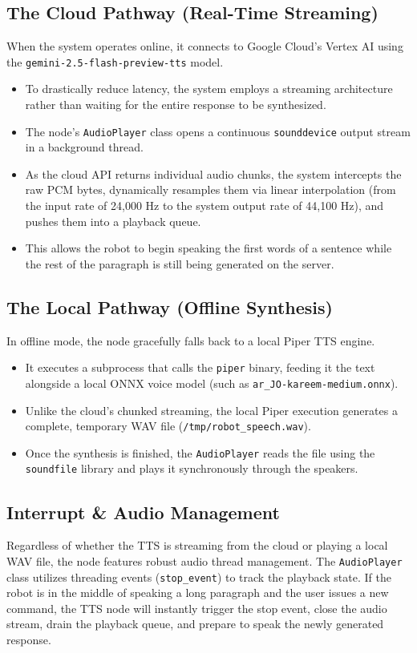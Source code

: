 \subsection{The Cloud Pathway (Real-Time Streaming)}
When the system operates online, it connects to Google Cloud's Vertex AI using the \texttt{gemini-2.5-flash-preview-tts} model.
\begin{itemize}
    \item To drastically reduce latency, the system employs a streaming architecture rather than waiting for the entire response to be synthesized.
    \item The node's \texttt{AudioPlayer} class opens a continuous \texttt{sounddevice} output stream in a background thread.
    \item As the cloud API returns individual audio chunks, the system intercepts the raw PCM bytes, dynamically resamples them via linear interpolation (from the input rate of 24,000 Hz to the system output rate of 44,100 Hz), and pushes them into a playback queue.
    \item This allows the robot to begin speaking the first words of a sentence while the rest of the paragraph is still being generated on the server.
\end{itemize}

\subsection{The Local Pathway (Offline Synthesis)}
In offline mode, the node gracefully falls back to a local Piper TTS engine.
\begin{itemize}
    \item It executes a subprocess that calls the \texttt{piper} binary, feeding it the text alongside a local ONNX voice model (such as \texttt{ar\_JO-kareem-medium.onnx}).
    \item Unlike the cloud's chunked streaming, the local Piper execution generates a complete, temporary WAV file (\texttt{/tmp/robot\_speech.wav}).
    \item Once the synthesis is finished, the \texttt{AudioPlayer} reads the file using the \texttt{soundfile} library and plays it synchronously through the speakers.
\end{itemize}

\subsection{Interrupt \& Audio Management}
Regardless of whether the TTS is streaming from the cloud or playing a local WAV file, the node features robust audio thread management. The \texttt{AudioPlayer} class utilizes threading events (\texttt{stop\_event}) to track the playback state. If the robot is in the middle of speaking a long paragraph and the user issues a new command, the TTS node will instantly trigger the stop event, close the audio stream, drain the playback queue, and prepare to speak the newly generated response.

